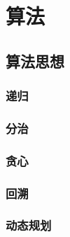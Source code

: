 \section{算法}

\subsection{算法思想}

\subsubsection{递归}

\subsubsection{分治}

\subsubsection{贪心}

\subsubsection{回溯}

\subsubsection{动态规划}
